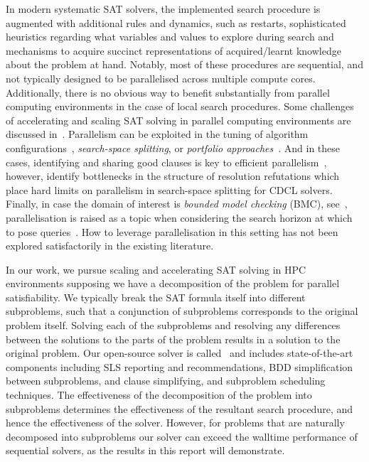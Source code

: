 \documentclass[
10pt, %
a4paper, %
oneside, %
headinclude,footinclude, %
BCOR5mm, %
]{scrartcl}
\begin{document}
In modern systematic SAT solvers, the implemented search procedure is augmented with additional rules and dynamics, such as restarts, sophisticated heuristics regarding what variables and values to explore during search and mechanisms to acquire succinct representations of acquired/learnt knowledge about the problem at hand.
Notably, most of these procedures are sequential, and not typically designed to be parallelised across multiple compute cores.
Additionally, there is no obvious way to benefit substantially from parallel computing environments in the case of local search procedures.
Some challenges of accelerating and scaling SAT solving in parallel computing environments are discussed in~\cite{AAAI125001}.
Parallelism can be exploited in the tuning of algorithm configurations~\cite{birattari:etal:2010}, {\em search-space splitting}, or {\em portfolio approaches}~\cite{lindauer:etal:2017,lindauer:etal:2015,hutter:etal:2009}.
And in these cases, identifying and sharing good clauses is key to efficient parallelism~\cite{audemard:and:simon:2009}, however, \cite{katsirelos:2013} identify bottlenecks in the structure of resolution refutations which place hard limits on parallelism in search-space splitting for CDCL solvers.
Finally, in case the domain of interest is {\em bounded model checking} (BMC), see~\cite{biere:etal:2003}, parallelisation is raised as a topic when considering the search horizon at which to pose queries~\cite{rintanen:2004,streeter:and:smith:2007}.
How to leverage parallelisation in this setting has not been explored satisfactorily in the existing literature. 

In our work, we pursue scaling and accelerating SAT solving in HPC environments supposing we have a decomposition of the problem for parallel satisfiability.
We typically break the SAT formula itself into different subproblems, such that a conjunction of subproblems corresponds to the original problem itself.
Solving each of the subproblems and resolving any differences between the solutions to the parts of the problem results in a solution to the original problem.
Our open-source solver is called \dagster\  and includes state-of-the-art components including SLS reporting and recommendations, BDD simplification between subproblems, and clause simplifying, and subproblem scheduling techniques.
The effectiveness of the decomposition of the problem into subproblems determines the effectiveness of the resultant search procedure, and hence the effectiveness of the solver.
However, for problems that are naturally decomposed into subproblems our solver can exceed the walltime performance of sequential solvers, as the results in this report will demonstrate.
\end{document}
